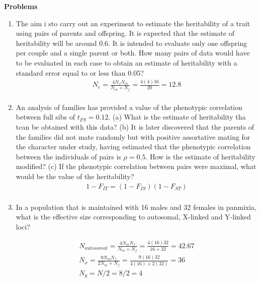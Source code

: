 \documentclass[12pt]{amsart}
\begin{document}
{\large \bf Problems}   
\begin{enumerate}
\item The aim i sto carry out an experiment to estimate the heritability of a trait using pairs of parents and offspring. It is expected that the estimate of heritability will be around 0.6. It is intended to evaluate only one offspring per couple and a single parent or both. How many pairs of data would have to be evaluated in each case to obtain an estimate of heritability with a standard error equal to or less than 0.05?
\begin{gather*}
N_e = \frac{4N_fN_m}{N_m + N_f} = \frac{4(4)16}{20} = 12.8\\
\end{gather*}

\item An analysis of families has provided a value of the phenotypic correlation between full sibs of $t_{FS} = 0.12$. (a) What is the estimate of heritability tha tcan be obtained with this data? (b) It is later discovered that the parents of the families did not mate randomly but with positive assortative mating for the character under study, having estimated that the phenotypic correlation between the individuals of pairs is $\rho = 0.5$. How is the estimate of heritability modified? (c) If the phenotypic correlation between pairs were maximal, what would be the value of the heritability? 
\begin{gather*}
1 - F_{IT} = (1-F_{IS})(1-F_{ST}) \\
\end{gather*}

\item In a population that is maintained with 16 males and 32 females in panmixia, what is the effective size corresponding to autosomal, X-linked and Y-linked loci?

\begin{gather*}
N_{autosomal} = \frac{4N_mN_f}{N_m + N_f} = \frac{4(16)32}{16 + 32} =  42.67\\
N_x = \frac{9N_mN_f}{2N_m + N_f} = \frac{9(16)32}{4(16) + 2(32)} = 36\\
N_y = N/2 = 8/2 = 4
\end{gather*}


\end{enumerate}
\end{document}
